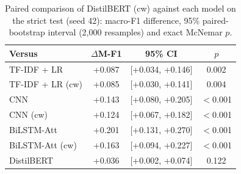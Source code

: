 \begin{table}[t]
\centering
\caption{Paired comparison of DistilBERT (cw) against each model on the strict test (seed 42): macro-F1 difference, 95\% paired-bootstrap interval (2{,}000 resamples) and exact McNemar $p$.}
\label{tab:sig}
\setlength{\tabcolsep}{4pt}
\begin{tabular}{lccc}
\toprule
Versus & $\Delta$M-F1 & 95\% CI & $p$ \\
\midrule
TF-IDF + LR & +0.087 & [+0.034, +0.146] & 0.002 \\
TF-IDF + LR (cw) & +0.085 & [+0.030, +0.141] & 0.004 \\
CNN & +0.143 & [+0.080, +0.205] & $<$0.001 \\
CNN (cw) & +0.124 & [+0.067, +0.182] & $<$0.001 \\
BiLSTM-Att & +0.201 & [+0.131, +0.270] & $<$0.001 \\
BiLSTM-Att (cw) & +0.163 & [+0.094, +0.227] & $<$0.001 \\
DistilBERT & +0.036 & [+0.002, +0.074] & 0.122 \\
\bottomrule
\end{tabular}
\end{table}
